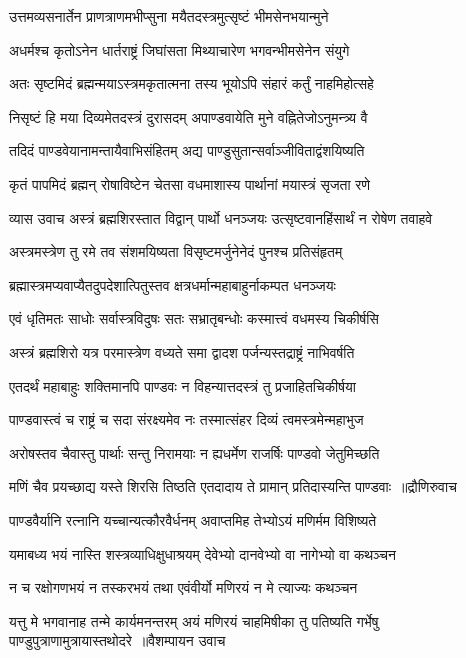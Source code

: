 \twolineshloka
{उत्तमव्यसनार्तेन प्राणत्राणमभीप्सुना}
{मयैतदस्त्रमुत्सृष्टं भीमसेनभयान्मुने}


\twolineshloka
{अधर्मश्च कृतोऽनेन धार्तराष्ट्रं जिघांसता}
{मिथ्याचारेण भगवन्भीमसेनेन संयुगे}


\twolineshloka
{अतः सृष्टमिदं ब्रह्मन्मयाऽस्त्रमकृतात्मना}
{तस्य भूयोऽपि संहारं कर्तुं नाहमिहोत्सहे}


\twolineshloka
{निसृष्टं हि मया दिव्यमेतदस्त्रं दुरासदम्}
{अपाण्डवायेति मुने वह्नितेजोऽनुमन्त्र्य वै}


\twolineshloka
{तदिदं पाण्डवेयानामन्तायैवाभिसंहितम्}
{अद्य पाण्डुसुतान्सर्वाञ्जीविताद्वंशयिष्यति}


\twolineshloka
{कृतं पापमिदं ब्रह्मन् रोषाविष्टेन चेतसा}
{वधमाशास्य पार्थानां मयास्त्रं सृजता रणे}


\threelineshloka
{व्यास उवाच}
{अस्त्रं ब्रह्मशिरस्तात विद्वान् पार्थो धनञ्जयः}
{उत्सृष्टवानहिंसार्थं न रोषेण तवाहवे}


\twolineshloka
{अस्त्रमस्त्रेण तु रमे तव संशमयिष्यता}
{विसृष्टमर्जुनेनेदं पुनश्च प्रतिसंहृतम्}


\twolineshloka
{ब्रह्मास्त्रमप्यवाप्यैतदुपदेशात्पितुस्तव}
{क्षत्रधर्मान्महाबाहुर्नाकम्पत धनञ्जयः}


\twolineshloka
{एवं धृतिमतः साधोः सर्वास्त्रविदुषः सतः}
{सभ्रातृबन्धोः कस्मात्त्वं वधमस्य चिकीर्षसि}


\twolineshloka
{अस्त्रं ब्रह्मशिरो यत्र परमास्त्रेण वध्यते}
{समा द्वादश पर्जन्यस्तद्राष्ट्रं नाभिवर्षति}


\twolineshloka
{एतदर्थं महाबाहुः शक्तिमानपि पाण्डवः}
{न विहन्यात्तदस्त्रं तु प्रजाहितचिकीर्षया}


\twolineshloka
{पाण्डवास्त्वं च राष्ट्रं च सदा संरक्ष्यमेव नः}
{तस्मात्संहर दिव्यं त्वमस्त्रमेन्महाभुज}


\threelineshloka
{अरोषस्तव चैवास्तु पार्थाः सन्तु निरामयाः}
{न ह्यधर्मेण राजर्षिः पाण्डवो जेतुमिच्छति}
{}


\threelineshloka
{मणिं चैव प्रयच्छाद्य यस्ते शिरसि तिष्ठति}
{एतदादाय ते प्रामान् प्रतिदास्यन्ति पाण्डवाः ॥द्रौणिरुवाच}
{}


\twolineshloka
{पाण्डवैर्यानि रत्नानि यच्चान्यत्कौरवैर्धनम्}
{अवाप्तमिह तेभ्योऽयं मणिर्मम विशिष्यते}


\twolineshloka
{यमाबध्य भयं नास्ति शस्त्रव्याधिक्षुधाश्रयम्}
{देवेभ्यो दानवेभ्यो वा नागेभ्यो वा कथञ्चन}


\twolineshloka
{न च रक्षोगणभयं न तस्करभयं तथा}
{एवंवीर्यो मणिरयं न मे त्याज्यः कथञ्चन}


\fourlineindentedshloka
{यत्तु मे भगवानाह तन्मे कार्यमनन्तरम्}
{अयं मणिरयं चाहमिषीका तु पतिष्यति}
{गर्भेषु पाण्डुपुत्राणामुत्रायास्तथोदरे ॥वैशम्पायन उवाच}
{}



